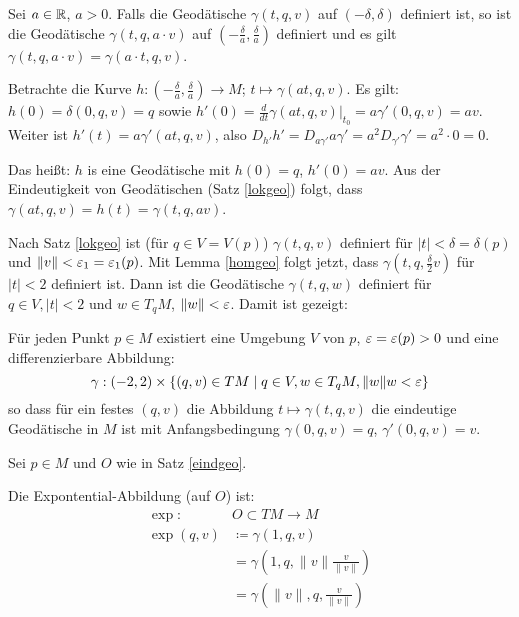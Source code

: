 \documentclass[a4paper,twoside,DIV15,BCOR12mm]{scrbook}
\renewcommand{\da}{\coloneqq}
\begin{document}
\begin{lemma}
\label{homgeo}
Sei $a\in \mathbb{R}$, $a>0$. Falls die Geodätische $\gamma(t,q,v)$ auf $(-\delta,\delta)$ definiert ist, so ist die Geodätische $\gamma(t,q,a\cdot v)$ auf $(-\frac \delta a, \frac \delta a)$ definiert und es gilt $\gamma(t,q,a\cdot v) = \gamma(a\cdot t, q ,v)$.
\end{lemma}

\begin{beweis}
Betrachte die Kurve $h: (-\frac \delta a, \frac \delta a) \to M$; $t\mapsto \gamma(at,q,v)$. Es gilt: $h(0)= \delta(0,q,v) = q$ sowie $h'(0) = \frac d{dt}\gamma(at,q,v)|_{t_0} = a \gamma'(0,q,v) = av$. Weiter ist $h'(t) = a\gamma'(at,q,v)$, also $D_{h'}h' = D_{a\gamma'}a\gamma' = a^2 D_{\gamma'}\gamma' = a^2\cdot 0 = 0.$

Das heißt: $h$ is eine Geodätische mit $h(0) = q$, $h'(0)=av$. Aus der Eindeutigkeit von Geodätischen (Satz \ref{lokgeo}) folgt, dass $\gamma(at,q,v) = h(t) = \gamma(t,q,av)$.
\end{beweis}

Nach Satz \ref{lokgeo} ist (für $q\in V=V(p)$) $\gamma(t,q,v)$ definiert für $|t|<\delta=\delta(p)$ und $\|v\| < \varepsilon_1=\varepsilon_1(p)$. Mit Lemma \ref{homgeo} folgt jetzt, dass $\gamma(t,q,\frac \delta 2 v)$ für $|t|<2$ definiert ist. Dann ist die Geodätische $\gamma(t,q,w)$ definiert für $q\in V, |t|<2$ und $w\in T_qM$, $\|w\|<\varepsilon$. Damit ist gezeigt: 
\begin{satz}
\label{eindgeo}
Für jeden Punkt $p\in M$ existiert eine Umgebung $V$ von $p$, $\varepsilon = \varepsilon(p)>0$ und eine differenzierbare Abbildung:
\[
\gamma: (-2,2) \times \{(q,v)\in TM \mid q\in V, w\in T_qM, \|w\|w < \varepsilon \}
\]
so dass für ein festes $(q,v)$ die Abbildung $t\mapsto \gamma(t,q,v)$ die eindeutige Geodätische in $M$ ist mit Anfangsbedingung $\gamma(0,q,v) = q$, $\gamma'(0,q,v) = v$.
\end{satz}

Sei $p\in M$ und $O$ wie in Satz \ref{eindgeo}.
\begin{definition}
Die Expontential-Abbildung (auf $O$) ist:
\begin{align*}
\exp :\quad &O \subset TM \to M\\
\exp(q,v) &\da \gamma(1,q,v) \\
&= \gamma(1,q,\|v\| \frac v {\|v\|}) \\
&= \gamma(\|v\|,q,\frac v {\|v\|})
\end{align*}
\end{definition}
\end{document}
